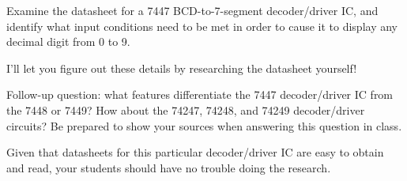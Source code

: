 

Examine the datasheet for a 7447 BCD-to-7-segment decoder/driver IC, and identify what input conditions need to be met in order to cause it to display any decimal digit from 0 to 9.







I'll let you figure out these details by researching the datasheet yourself!

\vskip 10pt

Follow-up question: what features differentiate the 7447 decoder/driver IC from the 7448 or 7449?  How about the 74247, 74248, and 74249 decoder/driver circuits?  Be prepared to show your sources when answering this question in class.







Given that datasheets for this particular decoder/driver IC are easy to obtain and read, your students should have no trouble doing the research.




